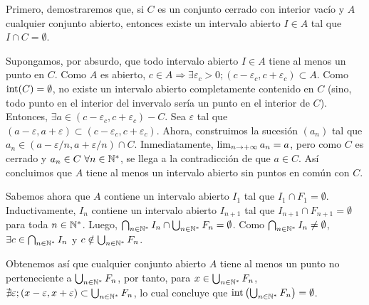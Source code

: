 
{
	\newcommand{\F}{\bigcup_{n\in\N}{F_n}}
	\newcommand{\I}{\bigcap_{n\in\N}{I_n}}
	\newcommand{\openci}[2]{\left(#1-#2,#1+#2\right)}

	Primero, demostraremos que, si $C$ es un conjunto cerrado con interior vacío y $A$ cualquier conjunto abierto, entonces existe un intervalo abierto $I\in A$ tal que $I\cap C = \emptyset$.

	Supongamos, por absurdo, que todo intervalo abierto $I\in A$ tiene al menos un punto en $C$. Como $A$ es abierto, $c\in A \Rightarrow \exists \varepsilon_c > 0; \openci{c}{\varepsilon_c} \subset A$.
	Como $\operatorname{int}(C) = \emptyset$, no existe un intervalo abierto completamente contenido en $C$ (sino, todo punto en el interior del invervalo sería un punto en el interior de $C$).
	Entonces, $\exists a\in \openci{c}{\varepsilon_c}-C$.
	Sea $\varepsilon$ tal que $\openci{a}{\varepsilon}\subset\openci{c}{\varepsilon_c}$.
	Ahora, construimos la sucesión $(a_n)$ tal que $a_n\in \openci{a}{\varepsilon/n}\cap C$.
	Inmediatamente, $\limite{n}{a_n} = a$, pero como $C$ es cerrado y $a_n\in C\ \forall n\in\mathbb{N}^*$, se llega a la contradicción de que $a\in C$.
	Así concluimos que $A$ tiene al menos un intervalo abierto sin puntos en común con $C$.

	Sabemos ahora que $A$ contiene un intervalo abierto $I_1$ tal que $I_1\cap F_1 = \emptyset$.
	Inductivamente, $I_n$ contiene un intervalo abierto $I_{n+1}$ tal que $I_{n+1}\cap F_{n+1} = \emptyset$ para toda $n\in\mathbb{N}^*$.
	Luego, $\I\cap\F=\emptyset$. Como $\I\neq\emptyset$, $\exists c\in\I$ y $c\notin\F$.

	Obtenemos así que cualquier conjunto abierto $A$ tiene al menos un punto no perteneciente a $\F$, por tanto, para $x\in\F$, $\nexists\varepsilon; \openci{x}{\varepsilon}\subset\F$, lo cual concluye que $\interior\left(\F\right) = \emptyset$.
}